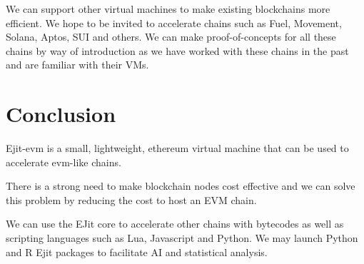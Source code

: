 \documentclass{article}
\begin{document}
We can support other virtual machines to make existing blockchains more efficient.
We hope to be invited to accelerate chains such as Fuel, Movement, Solana,
Aptos, SUI and others. We can make proof-of-concepts for all these chains
by way of introduction as we have worked with these chains in the past
and are familiar with their VMs.

\section{Conclusion}\label{sec:conclusion}

Ejit-evm is a small, lightweight, ethereum virtual machine that can be used to accelerate
evm-like chains.

There is a strong need to make blockchain nodes cost effective and we can solve this
problem by reducing the cost to host an EVM chain.

We can use the EJit core to accelerate other chains with bytecodes as well as
scripting languages such as Lua, Javascript and Python. We may launch Python
and R Ejit packages to facilitate AI and statistical analysis.


\end{document}
